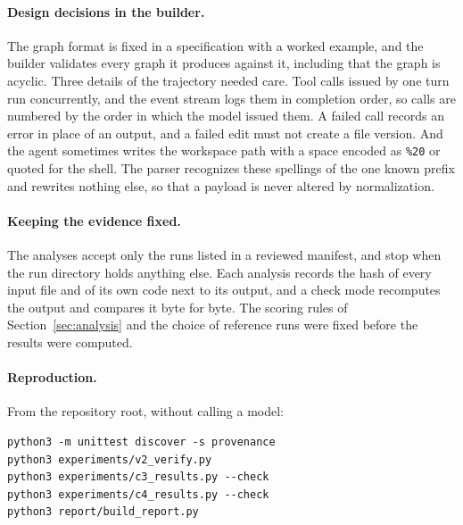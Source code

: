 \paragraph{Design decisions in the builder.}
The graph format is fixed in a specification with a worked example, and the builder validates every graph it produces against it, including that the graph is acyclic.
Three details of the trajectory needed care.
Tool calls issued by one turn run concurrently, and the event stream logs them in completion order, so calls are numbered by the order in which the model issued them.
A failed call records an error in place of an output, and a failed edit must not create a file version.
And the agent sometimes writes the workspace path with a space encoded as \texttt{\%20} or quoted for the shell.
The parser recognizes these spellings of the one known prefix and rewrites nothing else, so that a payload is never altered by normalization.

\paragraph{Keeping the evidence fixed.}
The analyses accept only the runs listed in a reviewed manifest, and stop when the run directory holds anything else.
Each analysis records the hash of every input file and of its own code next to its output, and a check mode recomputes the output and compares it byte for byte.
The scoring rules of Section~\ref{sec:analysis} and the choice of reference runs were fixed before the results were computed.

\paragraph{Reproduction.}
From the repository root, without calling a model:
\begin{verbatim}
python3 -m unittest discover -s provenance
python3 experiments/v2_verify.py
python3 experiments/c3_results.py --check
python3 experiments/c4_results.py --check
python3 report/build_report.py
\end{verbatim}
